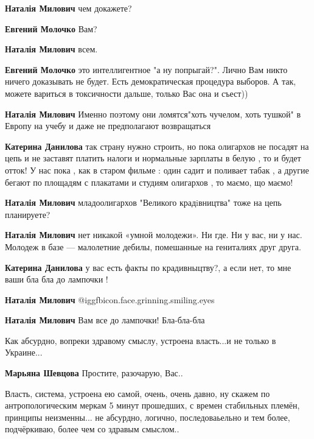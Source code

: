 \begin{itemize}
\begin{itemize} %
\textbf{Наталія Милович} чем докажете?

\textbf{Евгений Молочко} Вам?

\textbf{Наталія Милович} всем.

\textbf{Евгений Молочко} это интеллигентное "а ну попрыгай?". Лично Вам никто ничего доказывать не будет. Есть демократическая процедура выборов. А так, можете вариться в токсичности дальше, только Вас она и съест))

\textbf{Наталія Милович} Именно поэтому они ломятся"хоть чучелом, хоть тушкой" в Европу на учебу и даже не предполагают возвращаться

\textbf{Катерина Данилова} так страну нужно строить, но пока олигархов не посадят на цепь и не заставят платить налоги и нормальные зарплаты в белую , то и будет отток!
У нас пока , как в старом фильме : один садит и поливает табак , а другие бегают по площадям с плакатами и студиям олигархов , то маємо, що маємо!

\textbf{Наталія Милович} младоолигархов "Великого крадiвництва" тоже на цепь планируете?

\textbf{Наталія Милович} нет никакой «умной молодежи». Ни где. Ни у вас, ни у нас. Молодеж в базе — малолетние дебилы, помешанные на гениталиях друг друга.

\textbf{Катерина Данилова} у вас есть факты по крадивныцтву?, а если нет, то мне ваши бла бла до лампочки !

\textbf{Наталія Милович}  @igg{fbicon.face.grinning.smiling.eyes} 

\textbf{Наталія Милович} Вам все до лампочки! Бла-бла-бла

\end{itemize} %


Как абсурдно, вопреки здравому смыслу, устроена власть...и не только в
Украине...

\begin{itemize} %
\textbf{Марьяна Шевцова}
Простите, разочарую, Вас..

Власть, система, устроена ею самой, очень, очень давно, ну скажем по
антропологическим меркам 5 минут прошедших, с времен стабильных племён,
принципы неизменны... не абсурдно, логично, последоваьельно и тем более,
подчёркиваю, более чем со здравым смыслом..


\end{itemize}
\end{itemize}
